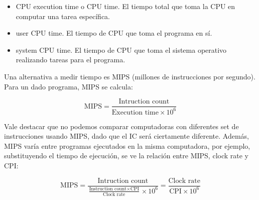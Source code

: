 \begin{itemize}
\item CPU execution time o CPU time. El tiempo total que toma la CPU en computar una tarea específica.
\item user CPU time. El tiempo de CPU que toma el programa en sí.
\item system CPU time. El tiempo de CPU que toma el sistema operativo realizando tareas para el programa.
\end{itemize}

Una alternativa a medir tiempo es MIPS (millones de instrucciones por segundo). Para un dado programa, MIPS se calcula:

\[ \text{MIPS} = \frac{\text{Intruction count}}{\text{Execution time} \times 10^6} \]  

Vale destacar que no podemos comparar computadoras con diferentes set de instrucciones usando MIPS, dado que el IC será ciertamente diferente. Además, MIPS varía entre programas ejecutados en la misma computadora, por ejemplo, substituyendo el tiempo de ejecución, se ve la relación entre MIPS, clock rate y CPI:

\[ \text{MIPS} = \frac{\text{Intruction count}}{\frac{\text{Instruction count} \times \text{CPI}}{\text{Clock rate}} \times 10^6} = \frac{\text{Clock rate}}{\text{CPI} \times 10^6} \]


%


